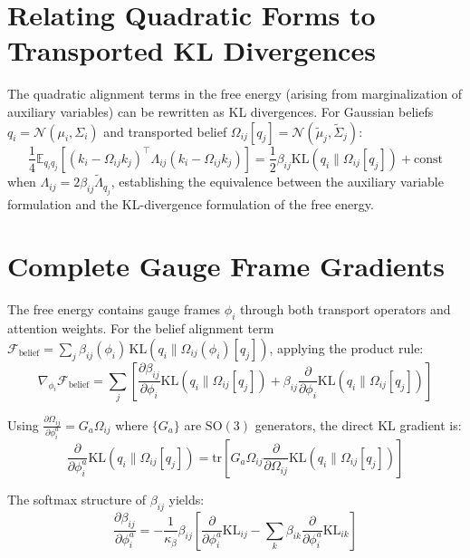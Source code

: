 \documentclass[11pt]{article}
\begin{document}
\section{Relating Quadratic Forms to Transported KL Divergences}
\label{app:quadratic}

The quadratic alignment terms in the free energy (arising from marginalization of auxiliary variables) can be rewritten as KL divergences. For Gaussian beliefs $q_i = \mathcal{N}(\mu_i, \Sigma_i)$ and transported belief $\Omega_{ij}[q_j] = \mathcal{N}(\tilde{\mu}_j, \tilde{\Sigma}_j)$:
\begin{equation}
\frac{1}{4}\mathbb{E}_{q_i q_j}[(k_i - \Omega_{ij}k_j)^\top \Lambda_{ij}(k_i - \Omega_{ij}k_j)] = \frac{1}{2}\beta_{ij}\mathrm{KL}(q_i \| \Omega_{ij}[q_j]) + \text{const}
\end{equation}
when $\Lambda_{ij} = 2\beta_{ij}\tilde{\Lambda}_{q_j}$, establishing the equivalence between the auxiliary variable formulation and the KL-divergence formulation of the free energy.

\section{Complete Gauge Frame Gradients}
\label{app:gauge_gradients}

The free energy contains gauge frames $\phi_i$ through both transport operators and attention weights. For the belief alignment term $\mathcal{F}_{\mathrm{belief}} = \sum_j \beta_{ij}(\phi_i) \, \mathrm{KL}(q_i \| \Omega_{ij}(\phi_i)[q_j])$, applying the product rule:
\begin{equation}
\nabla_{\phi_i} \mathcal{F}_{\mathrm{belief}} = \sum_j \left[ \frac{\partial \beta_{ij}}{\partial \phi_i} \mathrm{KL}(q_i \| \Omega_{ij}[q_j]) + \beta_{ij} \frac{\partial}{\partial \phi_i}\mathrm{KL}(q_i \| \Omega_{ij}[q_j]) \right]
\end{equation}

Using $\frac{\partial \Omega_{ij}}{\partial \phi_i^a} = G_a \Omega_{ij}$ where $\{G_a\}$ are $\mathrm{SO}(3)$ generators, the direct KL gradient is:
\begin{equation}
\frac{\partial}{\partial \phi_i^a}\mathrm{KL}(q_i \| \Omega_{ij}[q_j]) = \mathrm{tr}\left[G_a \Omega_{ij} \frac{\partial}{\partial \Omega_{ij}}\mathrm{KL}(q_i \| \Omega_{ij}[q_j])\right]
\end{equation}

The softmax structure of $\beta_{ij}$ yields:
\begin{equation}
\frac{\partial \beta_{ij}}{\partial \phi_i^a} = -\frac{1}{\kappa_\beta} \beta_{ij} \left[\frac{\partial}{\partial \phi_i^a}\mathrm{KL}_{ij} - \sum_k \beta_{ik} \frac{\partial}{\partial \phi_i^a}\mathrm{KL}_{ik}\right]
\end{equation}
\end{document}
